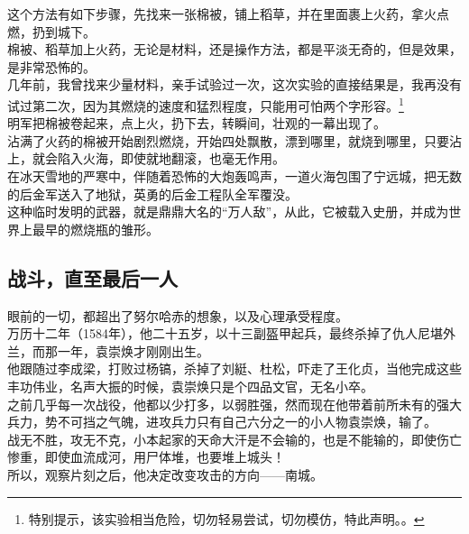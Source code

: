 \begin{multicols}{\theparacolNo}
这个方法有如下步骤，先找来一张棉被，铺上稻草，并在里面裹上火药，拿火点燃，扔到城下。\\

棉被、稻草加上火药，无论是材料，还是操作方法，都是平淡无奇的，但是效果，是非常恐怖的。\\

几年前，我曾找来少量材料，亲手试验过一次，这次实验的直接结果是，我再没有试过第二次，因为其燃烧的速度和猛烈程度，只能用可怕两个字形容。\footnote{特别提示，该实验相当危险，切勿轻易尝试，切勿模仿，特此声明。。}\\

明军把棉被卷起来，点上火，扔下去，转瞬间，壮观的一幕出现了。\\

沾满了火药的棉被开始剧烈燃烧，开始四处飘散，漂到哪里，就烧到哪里，只要沾上，就会陷入火海，即使就地翻滚，也毫无作用。\\

在冰天雪地的严寒中，伴随着恐怖的大炮轰鸣声，一道火海包围了宁远城，把无数的后金军送入了地狱，英勇的后金工程队全军覆没。\\

这种临时发明的武器，就是鼎鼎大名的“万人敌”，从此，它被载入史册，并成为世界上最早的燃烧瓶的雏形。\\

\subsection{战斗，直至最后一人}
眼前的一切，都超出了努尔哈赤的想象，以及心理承受程度。\\

万历十二年（1584年），他二十五岁，以十三副盔甲起兵，最终杀掉了仇人尼堪外兰，而那一年，袁崇焕才刚刚出生。\\

他跟随过李成梁，打败过杨镐，杀掉了刘綎、杜松，吓走了王化贞，当他完成这些丰功伟业，名声大振的时候，袁崇焕只是个四品文官，无名小卒。\\

之前几乎每一次战役，他都以少打多，以弱胜强，然而现在他带着前所未有的强大兵力，势不可挡之气魄，进攻兵力只有自己六分之一的小人物袁崇焕，输了。\\

战无不胜，攻无不克，小本起家的天命大汗是不会输的，也是不能输的，即使伤亡惨重，即使血流成河，用尸体堆，也要堆上城头！\\

所以，观察片刻之后，他决定改变攻击的方向——南城。\\


\end{multicols}

